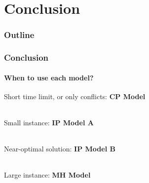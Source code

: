 \documentclass{beamer}
\newcommand{\AutoSectionTitle}{}
\begin{document}


\renewcommand{\AutoSectionTitle}{Conclusion}

\section{\AutoSectionTitle}

\begin{frame}
  \frametitle{Outline}
  \tableofcontents[currentsection]
\end{frame}




\begin{frame}
  \frametitle{\AutoSectionTitle}
  \framesubtitle{When to use each model?}
  
  \pause
  
  Short time limit, or only conflicts: \textbf{CP Model} \\~\\

  \pause
  
  Small instance: \textbf{IP Model A} \\~\\
  
  \pause
  
  Near-optimal solution: \textbf{IP Model B} \\~\\
  
  \pause
  
  Large instance: \textbf{MH Model}

\end{frame}





\end{document}

